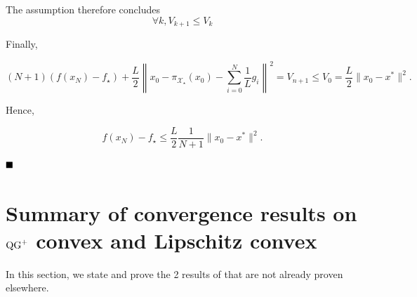         The assumption therefore concludes
        \begin{equation*}
            \forall k, V_{k+1} \leq V_k
        \end{equation*}
        
        Finally,
        
        \begin{equation*}
            (N+1)(f(x_{N}) - f_\star) + \frac{L}{2} \left\| x_0 - \pi_{\mathcal{X_\star}}(x_0) - \sum_{i=0}^{N}\frac{1}{L} g_i \right\|^2 = V_{n+1} \leq V_0 = \frac{L}{2}\|x_0 - x^*\|^2.
        \end{equation*}
        
        Hence,
        
        \begin{equation*}
            f(x_{N}) - f_\star \leq \frac{L}{2}\frac{1}{N+1}\|x_0 - x^*\|^2.
        \end{equation*}
        
    $\hfill\blacksquare$

\section{\texorpdfstring{Summary of convergence results on $\operatorname{QG}^+$ convex and Lipschitz convex}{Summary of convergence results on QG+ convex and Lipschitz convex}}
\label{apx:tab}

    In this section, we state and prove the 2 results of  that are not already proven elsewhere.
    
    \addtocounter{table}{-1}
    
